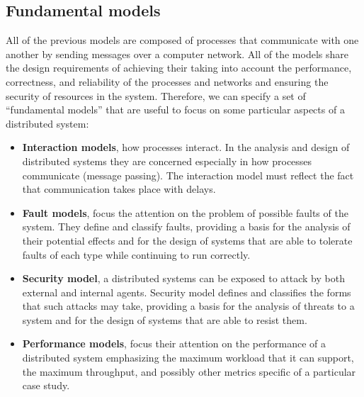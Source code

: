 \subsection{Fundamental models}
All of the previous models are composed of processes that communicate with one another by sending messages over a computer network. All of the models share the design requirements of achieving their taking into account the performance, correctness, and reliability of the processes and networks and ensuring the security of resources in the system. Therefore, we can specify a set of ``fundamental models'' that are useful to focus on some particular aspects of a distributed system:
\begin{itemize}
    \item \textbf{Interaction models}, how processes interact. In the analysis and design of distributed systems they are concerned especially in how processes communicate (message passing). The interaction model must reflect the fact that communication takes place with delays.
    \item \textbf{Fault models}, focus the attention on the problem of possible faults of the system. They define and classify faults, providing a basis for the analysis of their potential effects and for the design of systems that are able to tolerate faults of each type while continuing to run correctly.
    \item \textbf{Security model}, a distributed systems can be exposed to attack by both external and internal agents. Security model defines and classifies the forms that such attacks may take, providing a basis for the analysis of threats to a system and for the design of systems that are able to resist them.
    \item \textbf{Performance models}, focus their attention on the performance of a distributed system emphasizing the maximum workload that it can support, the maximum throughput, and possibly other metrics specific of a particular case study. 
\end{itemize}

